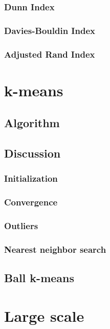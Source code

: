 \documentclass{article}
\begin{document}
\subsubsection{Dunn Index}

\subsubsection{Davies-Bouldin Index}

\subsubsection{Adjusted Rand Index}

\section{k-means}

\subsection{Algorithm}

\subsection{Discussion}

\subsubsection{Initialization}

\subsubsection{Convergence}

\subsubsection{Outliers}

\subsubsection{Nearest neighbor search}

\subsection{Ball k-means}

\section{Large scale}
\end{document}
